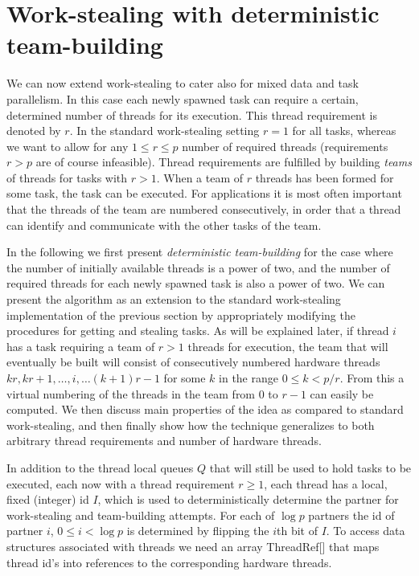 \documentclass[preprint]{sigplanconf}
\begin{document}
\section{Work-stealing with deterministic team-building}

We can now extend work-stealing to cater also for mixed data and task
parallelism. In this case each newly spawned task can require a
certain, determined number of threads for its execution. This thread
requirement is denoted by $r$. In the standard work-stealing setting
$r=1$ for all tasks, whereas we want to allow for any $1\leq r\leq p$
number of required threads (requirements $r>p$ are of course
infeasible). Thread requirements are fulfilled by building
\emph{teams} of threads for tasks with $r>1$. When a team of $r$
threads has been formed for some task, the task can be executed. For
applications it is most often important that the threads of the team are
numbered consecutively, in order that a thread can identify and communicate
with the other tasks of the team. 

In the following we first present \emph{deterministic team-building}
for the case where the number of initially available threads is
a power of two, and the number of required threads for each
newly spawned task is also a power of two. We can present the
algorithm as an extension to the standard work-stealing implementation
of the previous section by appropriately modifying the procedures for
getting and stealing tasks.  As will be explained later, if thread $i$
has a task requiring a team of $r>1$ threads for execution, the team
that will eventually be built will consist of consecutively numbered
hardware threads $kr,kr+1,\ldots,i,\ldots (k+1)r-1$ for some $k$ in
the range $0 \leq k < p/r$. From this a virtual numbering of the
threads in the team from $0$ to $r-1$ can easily be computed.  We then
discuss main properties of the idea as compared to standard
work-stealing, and then finally show how the technique generalizes to
both arbitrary thread requirements and number of hardware threads.

In addition to the thread local queues $Q$ that will still be used to
hold tasks to be executed, each now with a thread requirement $r\geq
1$, each thread has a local, fixed (integer) id $I$, which is used to
deterministically determine the partner for work-stealing and
team-building attempts. For each of $\log p$ partners the id of
partner $i$, $0\leq i<\log p$ is determined by flipping the $i$th bit
of $I$. To access data structures associated with threads we need 
an array ThreadRef[] that maps thread id's into references
to the corresponding hardware threads.
\end{document}
